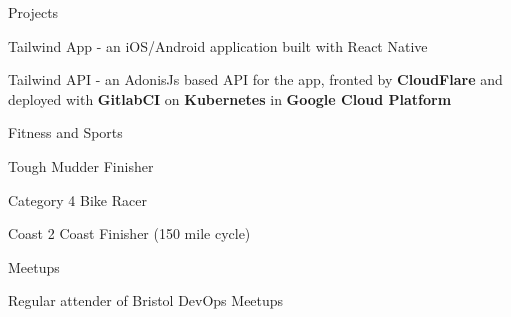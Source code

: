 

\begin{cventries}

  \cventry
  {Projects} %
  {} %
  {} %
  {} %
  {
    \begin{cvitems} %
      \item {Tailwind App - an iOS/Android application built with React Native}
      \item {Tailwind API - an AdonisJs based API for the app, fronted by \textbf{CloudFlare} and deployed with \textbf{GitlabCI} on \textbf{Kubernetes} in \textbf{Google Cloud Platform}}
    \end{cvitems}
  }
  \cventry
    {Fitness and Sports} %
    {} %
    {} %
    {} %
    {
      \begin{cvitems} %
        \item {Tough Mudder Finisher}
        \item {Category 4 Bike Racer}
        \item {Coast 2 Coast Finisher (150 mile cycle)}
      \end{cvitems}
    }

  \cventry
    {Meetups} %
    {} %
    {} %
    {} %
    {
      \begin{cvitems} %
        \item {Regular attender of Bristol DevOps Meetups}
      \end{cvitems}
    }

\end{cventries}

